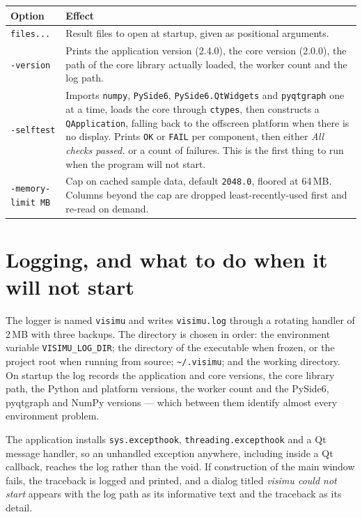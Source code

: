 \documentclass[11pt,a4paper,oneside]{report}
\newcommand{\appver}{2.4.0}
\newcommand{\code}[1]{\texttt{#1}}
\begin{document}
\begin{center}
\small
\begin{tabular}{@{}p{}p{}@{}}
\toprule
\textbf{Option} & \textbf{Effect} \\
\midrule
\code{files...} & Result files to open at startup, given as positional arguments. \\
\addlinespace
\code{-version} & Prints the application version (\appver), the core version
  (2.0.0), the path of the core library actually loaded, the worker count and
  the log path. \\
\addlinespace
\code{-selftest} & Imports \code{numpy}, \code{PySide6},
  \code{PySide6.QtWidgets} and \code{pyqtgraph} one at a time, loads the core
  through \code{ctypes}, then constructs a \code{QApplication}, falling back to
  the offscreen platform when there is no display. Prints \code{OK} or
  \code{FAIL} per component, then either \emph{All checks passed.} or a count of
  failures. This is the first thing to run when the program will not start. \\
\addlinespace
\code{-memory-limit MB} & Cap on cached sample data, default \code{2048.0},
  floored at 64\,MB. Columns beyond the cap are dropped least-recently-used
  first and re-read on demand. \\
\bottomrule
\end{tabular}
\end{center}

\section{Logging, and what to do when it will not start}

The logger is named \code{visimu} and writes \code{visimu.log} through a
rotating handler of 2\,MB with three backups. The directory is chosen in order:
the environment variable \code{VISIMU\_LOG\_DIR}; the directory of the
executable when frozen, or the project root when running from source;
\code{\textasciitilde/.visimu}; and the working directory. On startup the log
records the application and core versions, the core library path, the Python and
platform versions, the worker count and the PySide6, pyqtgraph and NumPy
versions --- which between them identify almost every environment problem.

The application installs \code{sys.excepthook},
\code{threading.excepthook} and a Qt message handler, so an unhandled exception
anywhere, including inside a Qt callback, reaches the log rather than the void.
If construction of the main window fails, the traceback is logged and printed,
and a dialog titled \emph{visimu could not start} appears with the log path as
its informative text and the traceback as its detail.
\end{document}
